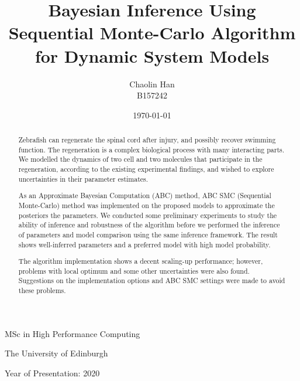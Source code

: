 \documentclass[12pt,a4paper]{report}
\begin{document}

\title{Bayesian Inference Using Sequential Monte-Carlo Algorithm for Dynamic System Models}

\author{Chaolin Han\\B157242}

\date{\today}

\makeEPCCtitle

\thispagestyle{empty}

\vspace{11cm}

\begin{center}

    \large{MSc in High Performance Computing}

    \large{The University of Edinburgh}

    \large{Year of Presentation: 2020}

\end{center}

\newpage

\begin{abstract}
    Zebrafish can regenerate the spinal cord after injury, and possibly recover swimming function. The regeneration is a complex biological process with many interacting parts. We modelled the dynamics of two cell and two molecules that participate in the regeneration, according to the existing experimental findings\cite{ref:Tsarouchas}, and wished to explore uncertainties in their parameter estimates.
    
    As an Approximate Bayesian Computation (ABC) method, ABC SMC (Sequential Monte-Carlo) method was implemented on the proposed models to approximate the posteriors the parameters. We conducted some preliminary experiments to study the ability of inference and robustness of the algorithm before we performed the inference of parameters and model comparison using the same inference framework. The result shows well-inferred parameters and a preferred model with high model probability.

    The algorithm implementation shows a decent scaling-up performance; however, problems with local optimum and some other uncertainties were also found. Suggestions on the implementation options and ABC SMC settings were made to avoid these problems.
\end{abstract}


\tableofcontents
\listoftables
\listoffigures
\end{document}
